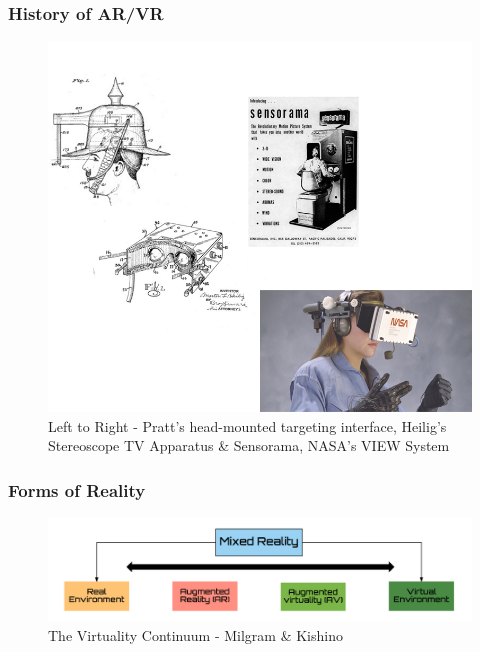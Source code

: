 \begin{frame}
	\frametitle{History of AR/VR}
	\begin{figure}
		\includegraphics[scale=.5]{assets/history.png}
		\caption{\tiny{Left to Right - Pratt's head-mounted targeting interface, Heilig's Stereoscope TV Apparatus \& Sensorama, NASA's VIEW System} }
	\end{figure}
\end{frame}

\begin{frame}
	\frametitle{Forms of Reality}
	\begin{figure}
		\includegraphics[scale=.2]{assets/continuum.png}
		\caption{The Virtuality Continuum - Milgram \& Kishino}
	\end{figure}
\end{frame}


